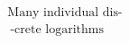 \documentclass[preview]{standalone}
\begin{document}
\begin{align*}
\text{Many individual dis-} \\\ \text{-crete logarithms}
\end{align*}
\end{document}
